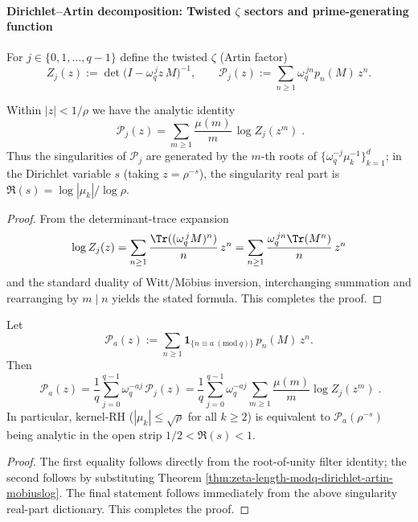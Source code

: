 \paragraph{Dirichlet--Artin decomposition: Twisted \texorpdfstring{$\zeta$}{zeta} sectors and prime-generating function}
For \(j\in\{0,1,\dots,q-1\}\) define the twisted \(\zeta\) (Artin factor)
\[
Z_j(z):=\det\bigl(I-\omega_q^{\,j}z\,M\bigr)^{-1},
\qquad
\mathcal{P}_j(z):=\sum_{n\ge1}\omega_q^{\,jn}p_n(M)\,z^n.
\]

\begin{theorem}\label{thm:zeta-length-modq-dirichlet-artin-mobiuslog}
Within \(|z|<1/\rho\) we have the analytic identity
\[
\boxed{\;
\mathcal{P}_j(z)=\sum_{m\ge1}\frac{\mu(m)}{m}\,\log Z_j(z^m)\; }.
\]
Thus the singularities of \(\mathcal{P}_j\) are generated by the \(m\)-th roots of \(\{\omega_q^{-j}\mu_k^{-1}\}_{k=1}^d\); in the Dirichlet variable \(s\) (taking \(z=\rho^{-s}\)), the singularity real part is
\(
\Re(s)=\log|\mu_k|/\log\rho
\).
\end{theorem}
\begin{proof}
From the determinant-trace expansion
\[
\log Z_j(z)=\sum_{n\ge1}\frac{\Tr((\omega_q^{\,j}M)^n)}{n}\,z^n
=\sum_{n\ge1}\frac{\omega_q^{\,jn}\Tr(M^n)}{n}\,z^n
\]
and the standard duality of Witt/Möbius inversion, interchanging summation and rearranging by \(m\mid n\) yields the stated formula. This completes the proof.
\end{proof}

\begin{corollary}\label{cor:zeta-length-modq-artin-decomposition}
Let
\[
\mathcal{P}_a(z):=\sum_{n\ge1}\mathbf 1_{\{n\equiv a\ (\mathrm{mod}\ q)\}}\,p_n(M)\,z^n.
\]
Then
\[
\boxed{\;
\mathcal{P}_a(z)
=\frac{1}{q}\sum_{j=0}^{q-1}\omega_q^{-aj}\,\mathcal{P}_j(z)
=\frac{1}{q}\sum_{j=0}^{q-1}\omega_q^{-aj}\sum_{m\ge1}\frac{\mu(m)}{m}\log Z_j(z^m)\; }.
\]
In particular, kernel-RH (\(|\mu_k|\le \sqrt{\rho}\) for all \(k\ge2\)) is equivalent to \(\mathcal{P}_a(\rho^{-s})\) being analytic in the open strip \(1/2<\Re(s)<1\).
\end{corollary}
\begin{proof}
The first equality follows directly from the root-of-unity filter identity; the second follows by substituting Theorem \ref{thm:zeta-length-modq-dirichlet-artin-mobiuslog}.
The final statement follows immediately from the above singularity real-part dictionary. This completes the proof.
\end{proof}

